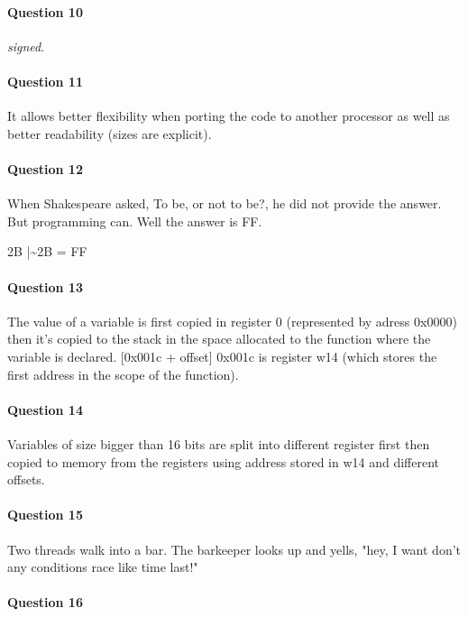 \documentclass[10pt]{article}
\begin{document}
\paragraph{Question 10}

\emph{signed}.


\paragraph{Question 11}

It allows better flexibility when porting the code to another processor as well as better readability (sizes are explicit).


\paragraph{Question 12}

When Shakespeare asked, To be, or not to be?, he did not provide the answer. But programming can. Well the answer is FF.

2B |\textasciitilde 2B = FF


\paragraph{Question 13}

The value of a variable is first copied in register 0 (represented by adress 0x0000) then it's copied to the stack in the space allocated to the function where the variable is declared. [0x001c + offset] 0x001c is register w14 (which stores the first address in the scope of the function).


\paragraph{Question 14}

Variables of size bigger than 16 bits are split into different register first then copied to memory from the registers using address stored in w14 and different offsets.


\paragraph{Question 15}

Two threads walk into a bar. The barkeeper looks up and yells, "hey, I want don't any conditions race like time last!"


\paragraph{Question 16}
\end{document}
